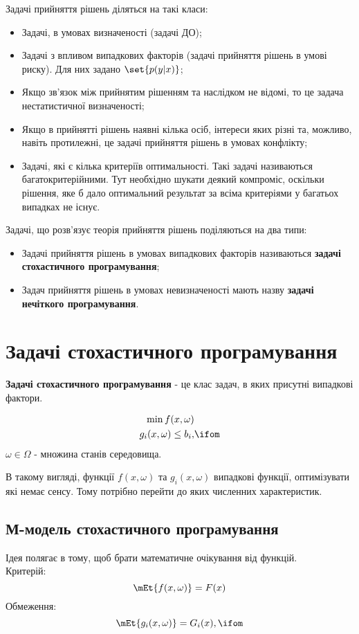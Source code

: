 Задачі прийняття рішень діляться на такі класи:
\begin{itemize}
\item Задачі, в умовах визначеності (задачі ДО);
\item Задачі з впливом випадкових факторів (задачі прийняття рішень в умові риску). Для них задано $\set{p(y|x)}$;
\item Якщо зв’язок між прийнятим рішенням та наслідком не відомі, то це задача нестатистичної визначеності;
\item Якщо в прийнятті рішень наявні кілька осіб, інтереси яких різні та, можливо, навіть протилежні, це задачі прийняття рішень в умовах конфлікту;
\item Задачі, які є кілька критеріїв оптимальності. Такі задачі називаються багатокритерійними. Тут необхідно шукати деякий компроміс, оскільки рішення, яке б дало оптимальний результат за всіма критеріями у багатьох випадках не існує.
\end{itemize}
Задачі, що розв’язує теорія прийняття рішень поділяються на два типи:
\begin{itemize}
\item Задачі прийняття рішень в умовах випадкових факторів називаються {\bf задачі стохастичного програмування};
\item Задач прийняття рішень в умовах невизначеності мають назву {\bf задачі нечіткого програмування}.
\end{itemize}
\section{Задачі стохастичного програмування}
{\bf Задачі стохастичного програмування} - це клас задач, в яких присутні випадкові фактори.\\
\begin{exs}
\begin{eqnarray}
\min f(x,\omega)&\\
g_i(x,\omega) \leq b_i,&\ifom
\end{eqnarray}
$\omega\in\Omega$ - множина станів середовища.
\end{exs}
В такому вигляді, функції $f(x,\omega)$ та $g_i(x,\omega)$ випадкові функції, оптимізувати які немає сенсу. Тому потрібно перейти до яких численних характеристик.
\subsection{М-модель стохастичного програмування}
Ідея полягає в тому, щоб брати математичне очікування від функцій.\\
Критерій:
\begin{equation}
\mEt{f(x,\omega)}=F(x)
\end{equation}
Обмеження:
\begin{equation}
\mEt{g_i(x,\omega)}=G_i(x),\ifom
\end{equation}
